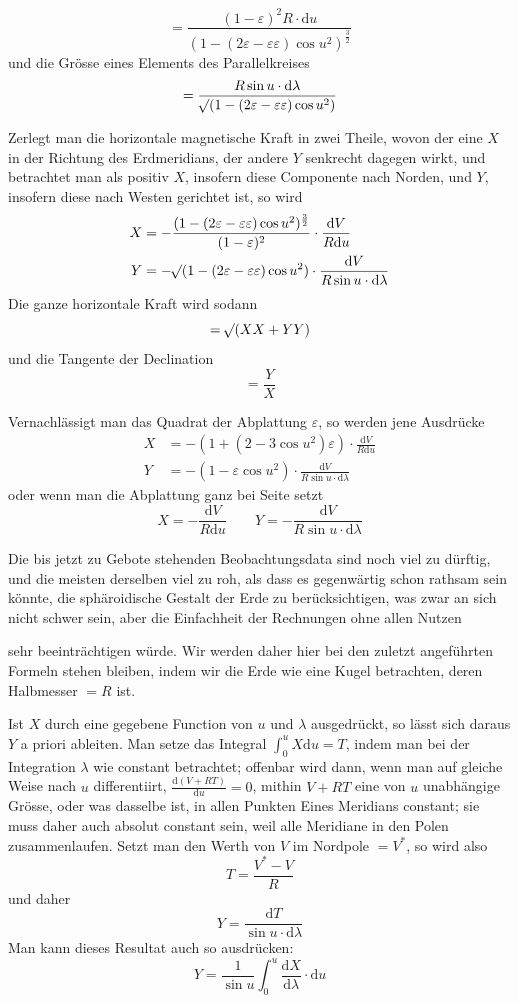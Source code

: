 \par\clearpage
{}
\[
=\frac{(1-\varepsilon)^2R\cdot\mathrm{d}u}{(1-(2\varepsilon-\varepsilon\varepsilon)\cos u^2)^{\frac32}}
\]
und die Grösse eines Elements des Parallelkreises
\[
=\frac{R\sin u\cdot\mathrm{d}\lambda}{\mathord{{}^{}\!\surd}(1-(2\varepsilon-\varepsilon\varepsilon)\cos u^2)}
\]

Zerlegt man die horizontale magnetische Kraft in zwei Theile, wovon der eine $X$ in der Richtung des Erdmeridians, der andere $Y$ senkrecht dagegen wirkt, und betrachtet man als positiv $X$, insofern diese Componente nach Norden, und $Y$, insofern diese nach Westen gerichtet ist, so wird
\[
\begin{aligned}
X&=-\frac{(1-(2\varepsilon-\varepsilon\varepsilon)\cos u^2)^{\frac32}}{(1-\varepsilon)^2}\cdot\frac{\mathrm{d}V}{R\mathrm{d}u}\\
Y&=-\mathord{{}^{}\!\surd}(1-(2\varepsilon-\varepsilon\varepsilon)\cos u^2)\cdot\frac{\mathrm{d}V}{R\sin u\cdot\mathrm{d}\lambda}
\end{aligned}
\]
Die ganze horizontale Kraft wird sodann
\[
=\mathord{{}^{}\!\surd}(XX+YY)
\]
und die Tangente der Declination
\[
=\frac YX
\]

Vernachlässigt man das Quadrat der Abplattung $\varepsilon$, so werden jene Ausdrücke
\[
\begin{aligned}
X&=-(1+(2-3\cos u^2)\varepsilon)\cdot\frac{\mathrm{d}V}{R\mathrm{d}u}\\
Y&=-(1-\varepsilon\cos u^2)\cdot\frac{\mathrm{d}V}{R\sin u\cdot\mathrm{d}\lambda}
\end{aligned}
\]
oder wenn man die Abplattung ganz bei Seite setzt
\[
X=-\frac{\mathrm{d}V}{R\mathrm{d}u}\qquad Y=-\frac{\mathrm{d}V}{R\sin u\cdot\mathrm{d}\lambda}
\]

Die bis jetzt zu Gebote stehenden Beobachtungsdata sind noch viel zu dürftig, und die meisten derselben viel zu roh, als dass es gegenwärtig schon rathsam sein könnte, die sphäroidische Gestalt der Erde zu berücksichtigen, was zwar an sich nicht schwer sein, aber die Einfachheit der Rechnungen ohne allen Nutzen\par\clearpage
{}
\noindent sehr beeinträchtigen würde. Wir werden daher hier bei den zuletzt angeführten Formeln stehen bleiben, indem wir die Erde wie eine Kugel betrachten, deren Halbmesser $=R$ ist.

Ist $X$ durch eine gegebene Function von $u$ und $\lambda$ ausgedrückt, so lässt sich daraus $Y$ a priori ableiten. Man setze das Integral $\int_0^u X\mathrm{d}u=T$, indem man bei der Integration $\lambda$ wie constant betrachtet; offenbar wird dann, wenn man auf gleiche Weise nach $u$ differentiirt, $\frac{\mathrm{d}(V+RT)}{\mathrm{d}u}=0$, mithin $V+RT$ eine von $u$ unabhängige Grösse, oder was dasselbe ist, in allen Punkten Eines Meridians constant; sie muss daher auch absolut constant sein, weil alle Meridiane in den Polen zusammenlaufen. Setzt man den Werth von $V$ im Nordpole $=V^*$, so wird also
\[
T=\frac{V^*-V}{R}
\]
und daher
\[
Y=\frac{\mathrm{d}T}{\sin u\cdot\mathrm{d}\lambda}
\]
Man kann dieses Resultat auch so ausdrücken:
\[
Y=\frac{1}{\sin u}\int_0^u\frac{\mathrm{d}X}{\mathrm{d}\lambda}\cdot\mathrm{d}u
\]

